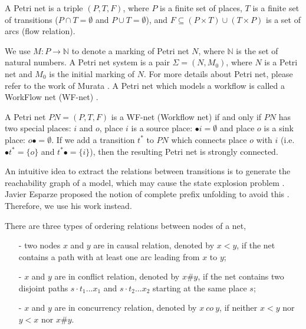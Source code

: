 \documentclass[dvips,...]{llncs}
\begin{document}
\begin{definition}\label{def:petrinet}
A Petri net is a triple $(P,T,F)$, where $P$ is a finite set of places, $T$ is a finite set of transitions ($P\cap T=\emptyset$ and $P\cup T=\emptyset$), and $F\subseteq(P\times T)\cup(T\times P)$ is a set of arcs (flow relation).
\end{definition}

We use $M:P\rightarrow\mathbb{N}$ to denote a marking of Petri net $N$, where $\mathbb{N}$ is the set of natural numbers. A Petri net system is a pair $\Sigma=(N,M_{0})$, where $N$ is a Petri net and $M_{0}$ is the initial marking of $N$. For more details about Petri net, please refer to the work of Murata \cite{murata1989petri}. A Petri net which models a workflow is called a WorkFlow net (WF-net) \cite{van1998application}.

\begin{definition}[WF-net]\label{def:wfnet}
A Petri net $PN=(P,T,F)$ is a WF-net (Workflow net) if and only if $PN$ has two special places: $i$ and $o$, place $i$ is a source place: $\bullet i=\emptyset$ and place $o$ is a sink place: $o\bullet =\emptyset$. If we add a transition $t^{*}$ to $PN$ which connects place $o$ with $i$ (i.e. $\bullet t^{*}=\{o\}$ and $t^{*}\bullet=\{i\}$), then the resulting Petri net is strongly connected.
\end{definition}

An intuitive idea to extract the relations between transitions is to generate the reachability graph of a model, which may cause the state explosion problem \cite{mcmillan1995technique}. Javier Esparze proposed the notion of complete prefix unfolding to avoid this \cite{esparza1996improvement}. Therefore, we use his work instead.

\begin{definition}\label{def:orderingRelations}
There are three types of ordering relations between nodes of a net,
	\begin{itemize}
		\item[-] two nodes $x$ and $y$ are in causal relation, denoted by $x<y$, if the net contains a path with at least one arc leading from $x$ to $y$;
		\item[-] $x$ and $y$ are in conflict relation, denoted by $x\#y$, if the net contains two disjoint paths $s\cdot t_{1}...x_{1}$ and $s\cdot t_{2}...x_{2}$ starting at the same place $s$;
		\item[-] $x$ and $y$ are in concurrency relation, denoted by $x~co~y$, if neither $x<y$ nor $y<x$ nor $x\#y$.
	\end{itemize}
\end{definition}
\end{document}
